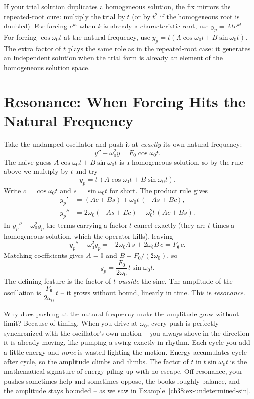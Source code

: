 \begin{trapbox}
If your trial solution duplicates a homogeneous solution, the fix mirrors the
repeated-root cure:
multiply the trial by $t$ (or by $t^2$ if the homogeneous root is doubled). For
forcing $e^{kt}$ when $k$ is already a characteristic root, use $y_p = A t e^{kt}$.
For forcing $\cos\omega_0 t$ at the natural frequency, use $y_p = t(A\cos\omega_0 t
+ B\sin\omega_0 t)$. The extra factor of $t$ plays the same role as in the
repeated-root case: it generates an independent solution when the trial form is
already an element of the homogeneous solution space.
\end{trapbox}

\section{Resonance: When Forcing Hits the Natural Frequency}
\label{ch38:resonance}

Take the undamped oscillator and push it at \emph{exactly} its own natural
frequency:
\begin{equation}
  y'' + \omega_0^2 y = F_0 \cos\omega_0 t.
  \label{ch38:resonance-eq}
\end{equation}
The naive guess $A\cos\omega_0 t + B\sin\omega_0 t$ is a homogeneous solution, so
by the rule above we multiply by $t$ and try
\[
  y_p = t\,(A\cos\omega_0 t + B\sin\omega_0 t).
\]
Write $c=\cos\omega_0 t$ and $s=\sin\omega_0 t$ for short. The product rule gives
\begin{align*}
  y_p'  &= (Ac + Bs) + \omega_0 t\,(-As + Bc), \\
  y_p'' &= 2\omega_0(-As + Bc) - \omega_0^2 t\,(Ac + Bs).
\end{align*}
In $y_p'' + \omega_0^2 y_p$ the terms carrying a factor $t$ cancel exactly (they are
$t$ times a homogeneous solution, which the operator kills), leaving
\[
  y_p'' + \omega_0^2 y_p = -2\omega_0 A\,s + 2\omega_0 B\,c = F_0\,c .
\]
Matching coefficients gives $A = 0$ and $B = F_0/(2\omega_0)$, so
\[
  y_p = \frac{F_0}{2\omega_0}\, t \sin\omega_0 t.
\]
The defining feature is the factor of $t$ \emph{outside} the sine. The amplitude
of the oscillation is $\dfrac{F_0}{2\omega_0}\,t$ -- it grows without bound,
linearly in time. This is \emph{resonance}.

\begin{happeningbox}
Why does pushing at the natural frequency make the amplitude grow without limit?
Because of timing. When you drive at $\omega_0$, every push is perfectly synchronized with the
oscillator's own motion -- you always shove in the direction it is already
moving, like pumping a swing exactly in rhythm. Each cycle you add a little
energy and \emph{none} is wasted fighting the motion. Energy accumulates cycle
after cycle, so the amplitude climbs and climbs. The factor of $t$ in $t\sin
\omega_0 t$ is the mathematical signature of energy piling up with no escape. Off
resonance, your pushes sometimes help and sometimes oppose, the books roughly
balance, and the amplitude stays bounded -- as we saw in
Example~\ref{ch38:ex-undetermined-sin}.
\end{happeningbox}

